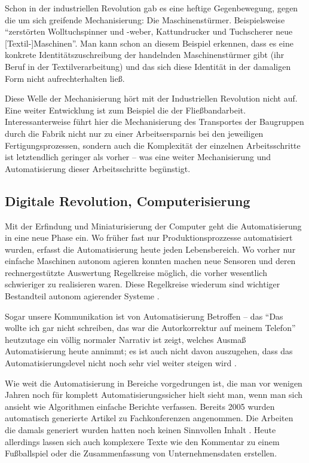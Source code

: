 Schon in der industriellen Revolution gab es eine heftige Gegenbewegung, gegen die um sich greifende Mechanisierung: Die Maschinenstürmer.
Beispielsweise \enquote{zerstörten Wolltuchspinner und -weber, Kattundrucker und Tuchscherer neue [Textil-]Maschinen}\parencite[44]{spehr}.
Man kann schon an diesem Beispiel erkennen, dass es eine konkrete Identitätszuschreibung der handelnden Maschinenstürmer gibt (ihr Beruf in der Textilverarbeitung) und das sich diese Identität in der damaligen Form nicht aufrechterhalten ließ.


Diese Welle der Mechanisierung hört mit der Industriellen Revolution nicht auf.
Eine weiter Entwicklung ist zum Beispiel die der Fließbandarbeit.
Interessanterweise führt hier die Mechanisierung des Transportes der Baugruppen durch die Fabrik nicht nur zu einer Arbeitsersparnis bei den jeweiligen Fertigungsprozessen, sondern auch die Komplexität der einzelnen Arbeitsschritte ist letztendlich geringer als vorher – was eine weiter Mechanisierung und Automatisierung dieser Arbeitsschritte begünstigt.

\subsection {Digitale Revolution, Computerisierung}
Mit der Erfindung und Miniaturisierung der Computer geht die Automatisierung in eine neue Phase ein. Wo früher fast nur Produktionsprozzesse automatisiert wurden, erfasst die Automatisierung heute jeden Lebensbereich.
Wo vorher nur einfache Maschinen autonom agieren konnten machen neue Sensoren und deren rechnergestützte Auswertung Regelkreise möglich, die vorher wesentlich schwieriger zu realisieren waren.
Diese Regelkreise wiederum sind wichtiger Bestandteil autonom agierender Systeme \parencite{ulrich}.


Sogar unsere Kommunikation ist von Automatisierung Betroffen – das \enquote{Das wollte ich gar nicht schreiben, das war die Autorkorrektur auf meinem Telefon} heutzutage ein völlig normaler Narrativ ist zeigt, welches Ausmaß Automatisierung heute annimmt; es ist auch nicht davon auszugehen, dass das Automatisierungslevel nicht noch sehr viel weiter steigen wird \parencite{arbeitsfrei}.

Wie weit die Automatisierung in Bereiche vorgedrungen ist, die man vor wenigen Jahren noch für komplett Automatisierungssicher hielt sieht man, wenn man sich ansieht wie Algorithmen einfache Berichte verfassen. Bereits 2005 wurden automatisch generierte Artikel zu Fachkonferenzen angenommen. Die Arbeiten die damals generiert wurden hatten noch keinen Sinnvollen Inhalt \parencite{scigen}.
Heute allerdings lassen sich auch komplexere Texte wie den Kommentar zu einem Fußballspiel oder die Zusammenfassung von Unternehmensdaten erstellen\parencite{bou}.

